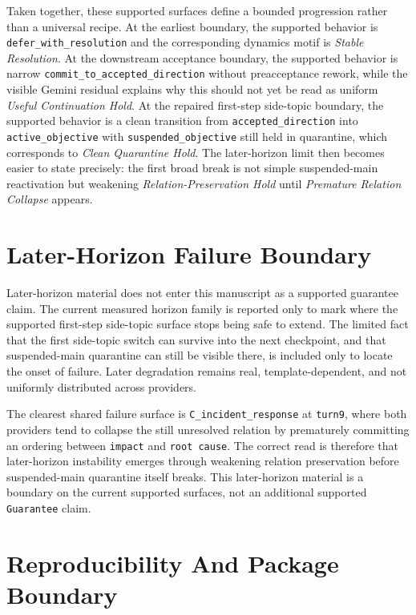 \documentclass[11pt]{article}
\begin{document}
Taken together, these supported surfaces define a bounded progression rather than
a universal recipe. At the earliest boundary, the supported behavior is
\texttt{defer\_with\_resolution} and the corresponding dynamics motif is
\textit{Stable Resolution}. At the downstream acceptance boundary, the supported
behavior is narrow \texttt{commit\_to\_accepted\_direction} without preacceptance
rework, while the visible Gemini residual explains why this should not yet be
read as uniform \textit{Useful Continuation Hold}. At the repaired first-step
side-topic boundary, the supported behavior is a clean transition from
\texttt{accepted\_direction} into \texttt{active\_objective} with
\texttt{suspended\_objective} still held in quarantine, which corresponds to
\textit{Clean Quarantine Hold}. The later-horizon limit then becomes easier to
state precisely: the first broad break is not simple suspended-main reactivation
but weakening \textit{Relation-Preservation Hold} until \textit{Premature
Relation Collapse} appears.

\section{Later-Horizon Failure Boundary}

Later-horizon material does not enter this manuscript as a supported guarantee
claim. The current measured horizon family is reported only to mark where the
supported first-step side-topic surface stops being safe to extend. The limited
fact that the first side-topic switch can survive into the next checkpoint, and
that suspended-main quarantine can still be visible there, is included only to
locate the onset of failure. Later degradation remains real, template-dependent,
and not uniformly distributed across providers.

The clearest shared failure surface is \texttt{C\_incident\_response} at
\texttt{turn9}, where both providers tend to collapse the still unresolved
relation by prematurely committing an ordering between \texttt{impact} and
\texttt{root cause}. The correct read is therefore that later-horizon
instability emerges through weakening relation preservation before
suspended-main quarantine itself breaks. This later-horizon material is a
boundary on the current supported surfaces, not an additional supported
\texttt{Guarantee} claim.

\section{Reproducibility And Package Boundary}
\end{document}
